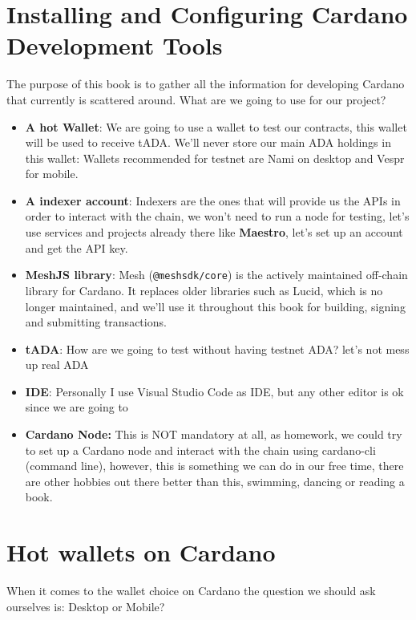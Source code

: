 \section{Installing and Configuring Cardano Development Tools}\label{sec:setup}
The purpose of this book is to gather all the information for developing Cardano that currently is scattered around.
What are we going to use for our project?


\begin{itemize}
  \item \textbf{A hot Wallet}: We are going to use a wallet to test our contracts, this wallet will be used to receive tADA. We'll never store our main ADA holdings in this wallet: Wallets recommended for testnet are Nami on desktop and  Vespr for mobile.
  \item \textbf{A indexer account}: Indexers are the ones that will provide us the APIs in order to interact with the chain, we won't need to run a node for testing, let's use services and projects already there like \textbf{Maestro}, let's set up an account and get the API key.
  \item \textbf{MeshJS library}: Mesh (\texttt{@meshsdk/core}) is the actively maintained off-chain library for Cardano. It replaces older libraries such as Lucid, which is no longer maintained, and we'll use it throughout this book for building, signing and submitting transactions.
  \item \textbf{tADA}: How are we going to test without having testnet ADA? let's not mess up real ADA
  \item  \textbf{IDE}: Personally I use Visual Studio Code as IDE, but any other editor is ok since we are going to
  \item \textbf{Cardano Node:} This is NOT mandatory at all, as homework, we could try to set up a Cardano node and interact with the chain using cardano-cli (command line), however, this is something we can do in our free time, there are other hobbies out there better than this, swimming, dancing or reading a book.
\end{itemize}

\section{Hot wallets on Cardano}
When it comes to the wallet choice on Cardano the question we should ask ourselves is: Desktop or Mobile?

